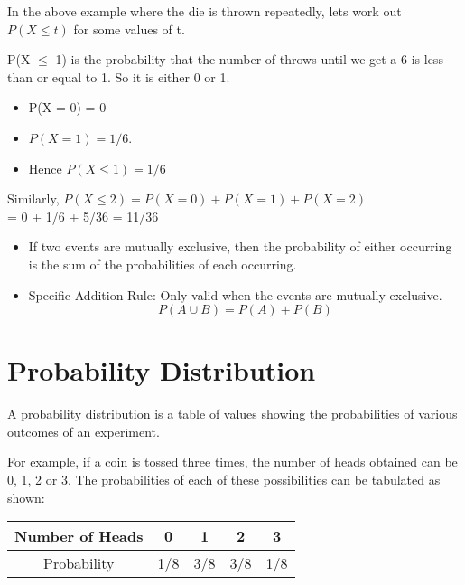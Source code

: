 \documentclass[]{report}
\begin{document}
{{{{{In the above example where the die is thrown repeatedly, lets work out $P(X \leq t)$ for some values of t.


P(X $\leq$ 1) is the probability that the number of throws until we get a 6 is less than or equal to 1. So it is either 0 or 1. 

\begin{itemize}
\item P(X = 0) = 0 
\item $P(X = 1) = 1/6$.
\item  Hence $P(X \leq 1) = 1/6$
\end{itemize}

Similarly, $P(X \leq 2) = P(X = 0) + P(X = 1) + P(X = 2)$\\ = 0 + 1/6 + 5/36 = 11/36

















\begin{itemize}
\item If two events are mutually exclusive, then the probability of either occurring is the sum of the probabilities of each occurring.
\item Specific Addition Rule: Only valid when the events are mutually exclusive.
\[P(A \cup B) = P(A) + P(B)\]
\end{itemize}   




\section*{Probability Distribution}
A probability distribution is a table of values showing the probabilities of various outcomes of an experiment.

For example, if a coin is tossed three times, the number of heads obtained can be 0, 1, 2 or 3. The probabilities of each of these possibilities can be tabulated as shown:

\begin{center}
\begin{tabular}{|c|c|c|c|c|}
\hline Number of Heads & 0 & 1 & 2 & 3 \\ 
\hline Probability & 1/8  & 3/8  & 3/8 & 1/8 \\ 
\hline 
\end{tabular} 
\end{center}

}}}}}
\end{document}
